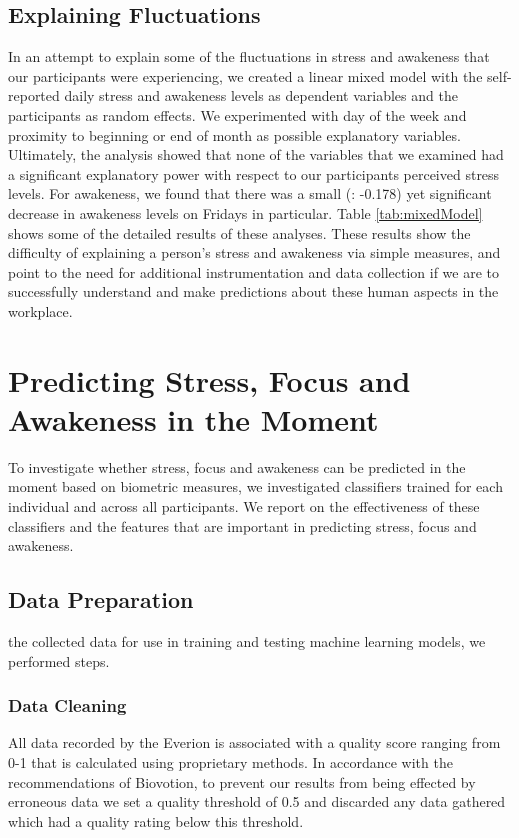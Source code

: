 \subsection{Explaining Fluctuations}
In an attempt to explain some of the fluctuations in stress and awakeness that our participants were experiencing, we created a linear mixed model with the self-reported daily stress and awakeness levels as dependent variables and the participants as random effects. We experimented with day of the week and proximity to beginning or end of month as possible explanatory variables. Ultimately, the analysis showed that none of the variables that we examined had a significant explanatory power with respect to our participants perceived stress levels.
For awakeness, we found  that there was a small (: -0.178) yet significant decrease in awakeness levels on Fridays in particular. Table \ref{tab:mixedModel} shows some of the detailed results of these analyses. These results show the difficulty of explaining a person's stress and awakeness via simple measures, and point to the need for additional instrumentation and data collection if we are to successfully understand and make predictions about these human aspects in the workplace.




\section{Predicting Stress, Focus and Awakeness in the Moment}
\label{secOverallAccuracy}

To investigate whether stress, focus and awakeness can be predicted in
the moment based on biometric measures,
we investigated classifiers trained
for each individual and across all participants. We report on the effectiveness of
these classifiers and the features that are important in predicting stress, focus
and awakeness.

\subsection{Data Preparation}

 the collected data for use in training and testing  machine learning models, we performed  steps.


\subsubsection{Data Cleaning}
All data recorded by the Everion is associated with a quality score ranging from 0-1 that is calculated using proprietary methods. In accordance with the recommendations of Biovotion,
to prevent our results from being effected by erroneous data we set a quality threshold of 0.5 and discarded any data gathered which had a quality rating below this threshold. 

